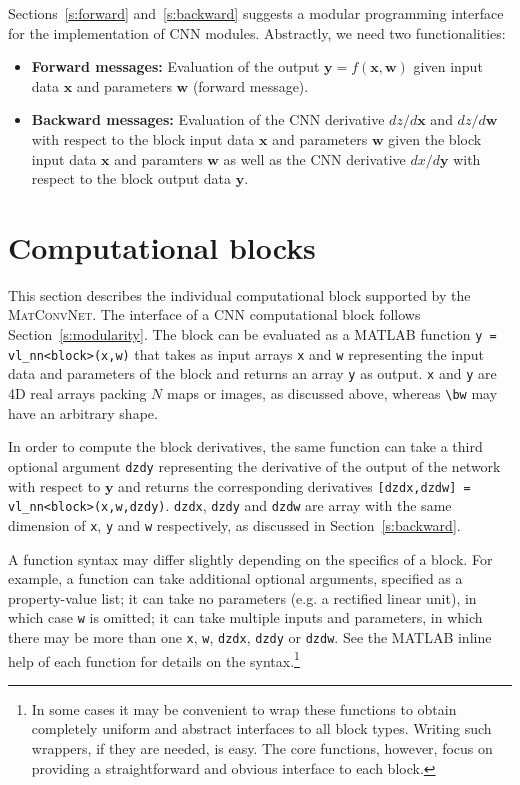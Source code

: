 \documentclass[12pt]{article}
\newcommand{\vlnn}{\textsc{MatConvNet}\xspace}
\newcommand{\bx}{\mathbf{x}}
\newcommand{\by}{\mathbf{y}}
\newcommand{\bw}{\mathbf{w}}
\begin{document}
Sections~\ref{s:forward} and~\ref{s:backward} suggests a modular programming interface for the implementation of CNN modules. Abstractly, we need two functionalities:
\begin{itemize}
\item {\bf Forward messages:} Evaluation of the output $\by=f(\bx,\bw)$ given input data $\bx$ and parameters $\bw$ (forward message).
\item {\bf Backward messages:} Evaluation of the CNN derivative $dz/d\bx$ and $dz/d\bw$ with respect to the block input data $\bx$ and parameters $\bw$ given the block input data $\bx$ and paramters $\bw$ as well as the CNN derivative $dx/d\by$ with respect to the block output data $\by$.
\end{itemize}



\section{Computational blocks}\label{s:blocks}

This section describes the individual computational block supported by the \vlnn. The interface of a CNN computational block follows Section~\ref{s:modularity}. The block can be evaluated as a MATLAB function \verb!y = vl_nn<block>(x,w)! that takes as input arrays \verb!x! and \verb!w! representing the input data and parameters of the block and returns an array \verb!y! as output. \verb!x! and \verb!y! are 4D real arrays packing $N$ maps or images, as discussed above, whereas \verb!\bw! may have an arbitrary shape.

In order to compute the block derivatives, the same function can take a third optional argument \verb!dzdy! representing the derivative of the output of the network with respect to $\by$ and returns the corresponding derivatives \verb![dzdx,dzdw] = vl_nn<block>(x,w,dzdy)!. \verb!dzdx!, \verb!dzdy! and \verb!dzdw! are array with the same dimension of \verb!x!, \verb!y! and \verb!w! respectively, as discussed in Section~\ref{s:backward}.

A function syntax may differ slightly depending on the specifics of a block. For example, a function can take additional optional arguments, specified as a property-value list; it can take no parameters (e.g. a rectified linear unit), in which case \verb!w! is omitted; it can take multiple inputs and parameters, in which there may be more than one \verb!x!, \verb!w!, \verb!dzdx!, \verb!dzdy! or \verb!dzdw!. See the MATLAB inline help of each function for details on the syntax.\footnote{In some cases it may be convenient to wrap these functions to obtain completely uniform and abstract interfaces to all block types. Writing such wrappers, if they are needed, is easy. The core functions, however, focus on providing a straightforward and obvious interface to each block.}
\end{document}
